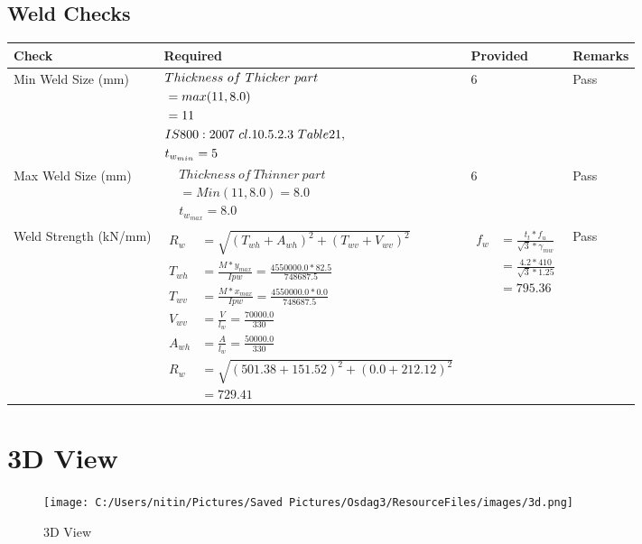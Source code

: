 \documentclass{article}%
\begin{document}
\subsection{Weld Checks}%
\label{subsec:WeldChecks}%
\renewcommand{\arraystretch}{1.2}%
\begin{longtable}{|p{4cm}|p{7.0cm}|p{3.5cm}|p{1.5cm}|}%
\hline%
\rowcolor{OsdagGreen}%
Check&Required&Provided&Remarks\\%
\hline%
\endhead%
\hline%
Min Weld Size (mm)&$\begin{aligned} &Thickness~of~Thicker~part\\ \noindent &=max(11,8.0)\\ &=11\\ &IS800:2007~cl.10.5.2.3~Table 21,\\  &t_{w_{min}}=5\end{aligned}$&6&Pass\\%
\hline%
Max Weld Size (mm)&$\begin{aligned} & Thickness~of~Thinner~part\\ &=Min(11,8.0)=8.0\\ &t_{w_{max}} =8.0\end{aligned}$&6&Pass\\%
\hline%
Weld Strength (kN/mm)&$\begin{aligned} R_w&=\sqrt{(T_{wh}+A_{wh})^2 + (T_{wv}+V_{wv})^2}\\ T_{wh}&=\frac{M*y_{max}}{I{pw}}=\frac{4550000.0*82.5}{748687.5}\\ T_{wv}&=\frac{M*x_{max}}{I{pw}}=\frac{4550000.0*0.0}{748687.5}\\ V_{wv}&=\frac{V}{l_w}=\frac{70000.0}{330}\\ A_{wh}&=\frac{A}{l_w}=\frac{50000.0}{330}\\ R_w&=\sqrt{(501.38+151.52)^2 + (0.0+212.12)^2}\\ &=729.41\end{aligned}$&$\begin{aligned} f_w &=\frac{t_t*f_u}{\sqrt{3}*\gamma_{mw}}\\ &=\frac{4.2*410}{\sqrt{3}*1.25}\\ &=795.36\end{aligned}$&Pass\\%
\hline%
\end{longtable}

%
%
\newpage%
\section{3D View}%
\label{sec:3DView}%


\begin{figure}[h!]%
\centering%
\texttt{[image: C:/Users/nitin/Pictures/Saved Pictures/Osdag3/ResourceFiles/images/3d.png]}%
\caption{3D View}%
\end{figure}

%
\end{document}
